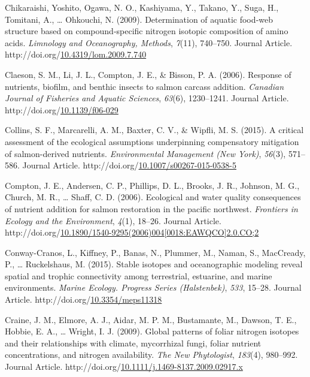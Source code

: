 \documentclass [11pt, proquest] {uwthesis}[2015/03/03]
\newlength{\cslhangindent}
\newenvironment{CSLReferences}%
{\setlength{\parindent}{0pt}%
\everypar{\setlength{\hangindent}{\cslhangindent}}\ignorespaces}%
{\par}
\begin{document}
\begin{CSLReferences}{1}{0}
\leavevmode\hypertarget{ref-Chikaraishi2009}{}%
Chikaraishi, Yoshito, Ogawa, N. O., Kashiyama, Y., Takano, Y., Suga, H., Tomitani, A., \ldots{} Ohkouchi, N. (2009). Determination of aquatic food‐web structure based on compound‐specific nitrogen isotopic composition of amino acids. \emph{Limnology and Oceanography, Methods}, \emph{7}(11), 740--750. Journal Article. http://doi.org/\href{https://doi.org/10.4319/lom.2009.7.740}{10.4319/lom.2009.7.740}

\leavevmode\hypertarget{ref-Claeson2006}{}%
Claeson, S. M., Li, J. L., Compton, J. E., \& Bisson, P. A. (2006). Response of nutrients, biofilm, and benthic insects to salmon carcass addition. \emph{Canadian Journal of Fisheries and Aquatic Sciences}, \emph{63}(6), 1230--1241. Journal Article. http://doi.org/\href{https://doi.org/10.1139/f06-029}{10.1139/f06-029}

\leavevmode\hypertarget{ref-Collins2015}{}%
Collins, S. F., Marcarelli, A. M., Baxter, C. V., \& Wipfli, M. S. (2015). A critical assessment of the ecological assumptions underpinning compensatory mitigation of salmon-derived nutrients. \emph{Environmental Management (New York)}, \emph{56}(3), 571--586. Journal Article. http://doi.org/\href{https://doi.org/10.1007/s00267-015-0538-5}{10.1007/s00267-015-0538-5}

\leavevmode\hypertarget{ref-Compton2006}{}%
Compton, J. E., Andersen, C. P., Phillips, D. L., Brooks, J. R., Johnson, M. G., Church, M. R., \ldots{} Shaff, C. D. (2006). Ecological and water quality consequences of nutrient addition for salmon restoration in the pacific northwest. \emph{Frontiers in Ecology and the Environment}, \emph{4}(1), 18--26. Journal Article. http://doi.org/\href{https://doi.org/10.1890/1540-9295(2006)004\%5B0018:EAWQCO\%5D2.0.CO;2}{10.1890/1540-9295(2006)004{[}0018:EAWQCO{]}2.0.CO;2}

\leavevmode\hypertarget{ref-Conway2015}{}%
Conway-Cranos, L., Kiffney, P., Banas, N., Plummer, M., Naman, S., MacCready, P., \ldots{} Ruckelshaus, M. (2015). Stable isotopes and oceanographic modeling reveal spatial and trophic connectivity among terrestrial, estuarine, and marine environments. \emph{Marine Ecology. Progress Series (Halstenbek)}, \emph{533}, 15--28. Journal Article. http://doi.org/\href{https://doi.org/10.3354/meps11318}{10.3354/meps11318}

\leavevmode\hypertarget{ref-Craine2009}{}%
Craine, J. M., Elmore, A. J., Aidar, M. P. M., Bustamante, M., Dawson, T. E., Hobbie, E. A., \ldots{} Wright, I. J. (2009). Global patterns of foliar nitrogen isotopes and their relationships with climate, mycorrhizal fungi, foliar nutrient concentrations, and nitrogen availability. \emph{The New Phytologist}, \emph{183}(4), 980--992. Journal Article. http://doi.org/\href{https://doi.org/10.1111/j.1469-8137.2009.02917.x}{10.1111/j.1469-8137.2009.02917.x}


\end{CSLReferences}
\end{document}
